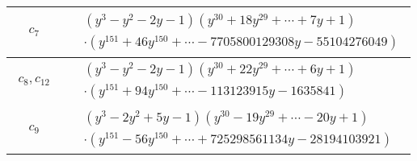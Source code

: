\documentclass[1p]{elsarticle_modified}
\theoremstyle{definition}
\begin{document}
\begin{tabular}{m{50pt}|m{274pt}}
\hline $$\begin{aligned}c_{7}\end{aligned}$$&$\begin{aligned}
&(y^3- y^2-2 y-1)(y^{30}+18 y^{29}+\cdots+7 y+1)\\
&\cdot(y^{151}+46 y^{150}+\cdots-7705800129308 y-55104276049)
\end{aligned}$\\
\hline $$\begin{aligned}c_{8},c_{12}\end{aligned}$$&$\begin{aligned}
&(y^3- y^2-2 y-1)(y^{30}+22 y^{29}+\cdots+6 y+1)\\
&\cdot(y^{151}+94 y^{150}+\cdots-113123915 y-1635841)
\end{aligned}$\\
\hline $$\begin{aligned}c_{9}\end{aligned}$$&$\begin{aligned}
&(y^3-2 y^2+5 y-1)(y^{30}-19 y^{29}+\cdots-20 y+1)\\
&\cdot(y^{151}-56 y^{150}+\cdots+725298561134 y-28194103921)
\end{aligned}$\\
\hline
\end{tabular}
\vskip 2pc
\end{document}
